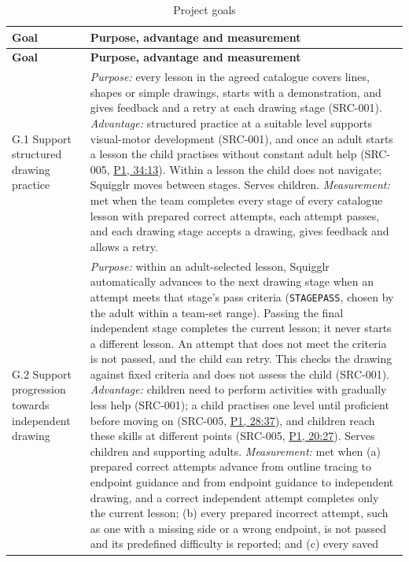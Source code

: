 \documentclass[12pt]{article}
\renewcommand{\_}{\textunderscore\allowbreak}%
\newcommand{\intlink}[3]{\hyperref[int:#1-#2]{#3}}
\newcommand{\intref}[2]{\intlink{#1}{#2}{#1, #2}}
\begin{document}
{\small
\begin{longtable}{@{}>{\raggedright\arraybackslash}p{}p{}@{}}
\caption{Project goals}\label{tab:goals}\\
\toprule
\textbf{Goal} & \textbf{Purpose, advantage and measurement} \\
\midrule
\endfirsthead
\toprule
\textbf{Goal} & \textbf{Purpose, advantage and measurement} \\
\midrule
\endhead
\bottomrule
\endlastfoot
{}\label{goal:1}%
G.1 Support structured drawing practice & \emph{Purpose:} every lesson in the
agreed catalogue covers lines, shapes or simple drawings, starts with a
demonstration, and gives feedback and a retry at each drawing stage (SRC-001).
\emph{Advantage:} structured practice at a suitable level supports visual-motor
development (SRC-001), and once an adult starts a lesson the child practises
without constant adult help (SRC-005, \intref{P1}{34:13}). Within a lesson the
child does not navigate; Squigglr moves between stages. Serves children.
\emph{Measurement:} met when the team completes every stage of every catalogue
lesson with prepared correct attempts, each attempt passes, and each drawing
stage accepts a drawing, gives feedback and allows a retry. \\
\addlinespace
{}\label{goal:2}%
G.2 Support progression towards independent drawing & \emph{Purpose:} within an
adult-selected lesson, Squigglr automatically advances to the next drawing stage
when an attempt meets that stage's pass criteria (\texttt{STAGE\_PASS}, chosen
by the adult within a team-set range). Passing the final independent stage
completes the current lesson; it never starts a different lesson. An attempt
that does not meet the criteria is not passed, and the child can retry. This
checks the drawing against fixed criteria and does not assess the child
(SRC-001). \emph{Advantage:} children need to perform activities with gradually
less help (SRC-001); a child practises one level until proficient before moving
on (SRC-005, \intref{P1}{28:37}), and children reach these skills at different
points (SRC-005, \intref{P1}{20:27}). Serves children and supporting adults.
\emph{Measurement:} met when (a) prepared correct attempts advance from outline
tracing to endpoint guidance and from endpoint guidance to independent drawing,
and a correct independent attempt completes only the current lesson; (b) every
prepared incorrect attempt, such as one with a missing side or a wrong endpoint,
is not passed and its predefined difficulty is reported; and (c) every saved

\end{longtable}}
\end{document}
